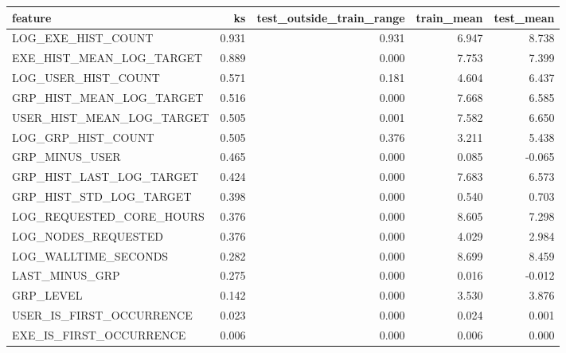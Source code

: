 \begin{tabular}{lrrrr}
\toprule
feature & ks & test_outside_train_range & train_mean & test_mean \\
\midrule
LOG_EXE_HIST_COUNT & 0.931 & 0.931 & 6.947 & 8.738 \\
EXE_HIST_MEAN_LOG_TARGET & 0.889 & 0.000 & 7.753 & 7.399 \\
LOG_USER_HIST_COUNT & 0.571 & 0.181 & 4.604 & 6.437 \\
GRP_HIST_MEAN_LOG_TARGET & 0.516 & 0.000 & 7.668 & 6.585 \\
USER_HIST_MEAN_LOG_TARGET & 0.505 & 0.001 & 7.582 & 6.650 \\
LOG_GRP_HIST_COUNT & 0.505 & 0.376 & 3.211 & 5.438 \\
GRP_MINUS_USER & 0.465 & 0.000 & 0.085 & -0.065 \\
GRP_HIST_LAST_LOG_TARGET & 0.424 & 0.000 & 7.683 & 6.573 \\
GRP_HIST_STD_LOG_TARGET & 0.398 & 0.000 & 0.540 & 0.703 \\
LOG_REQUESTED_CORE_HOURS & 0.376 & 0.000 & 8.605 & 7.298 \\
LOG_NODES_REQUESTED & 0.376 & 0.000 & 4.029 & 2.984 \\
LOG_WALLTIME_SECONDS & 0.282 & 0.000 & 8.699 & 8.459 \\
LAST_MINUS_GRP & 0.275 & 0.000 & 0.016 & -0.012 \\
GRP_LEVEL & 0.142 & 0.000 & 3.530 & 3.876 \\
USER_IS_FIRST_OCCURRENCE & 0.023 & 0.000 & 0.024 & 0.001 \\
EXE_IS_FIRST_OCCURRENCE & 0.006 & 0.000 & 0.006 & 0.000 \\
\bottomrule
\end{tabular}
